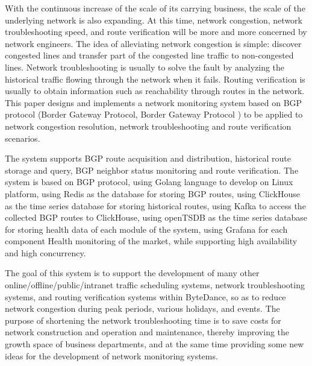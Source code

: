 \begin{abstract*}
With the continuous increase of the scale of its carrying business, the scale of the underlying network is also expanding. At this time, network congestion, network troubleshooting speed, and route verification will be more and more concerned by network engineers. The idea of alleviating network congestion is simple: discover congested lines and transfer part of the congested line traffic to non-congested lines. Network troubleshooting is usually to solve the fault by analyzing the historical traffic flowing through the network when it fails. Routing verification is usually to obtain information such as reachability through routes in the network. This paper designs and implements a network monitoring system based on BGP protocol (Border Gateway Protocol, Border Gateway Protocol ) to be applied to network congestion resolution, network troubleshooting and route verification scenarios.  

The system supports BGP route acquisition and distribution, historical route storage and query, BGP neighbor status monitoring and route verification. The system is based on BGP protocol, using Golang language to develop on Linux platform, using Redis as the database for storing BGP routes, using ClickHouse as the time series database for storing historical routes, using Kafka to access the collected BGP routes to ClickHouse, using openTSDB as the time series database for storing health data of each module of the system, using Grafana for each component Health monitoring of the market, while supporting high availability and high concurrency. 

The goal of this system is to support the development of many other online/offline/public/intranet traffic scheduling systems, network troubleshooting systems, and routing verification systems within ByteDance, so as to reduce network congestion during peak periods, various holidays, and events. The purpose of shortening the network troubleshooting time is to save costs for network construction and operation and maintenance, thereby improving the growth space of business departments, and at the same time providing some new ideas for the development of network monitoring systems.
\end{abstract*}
